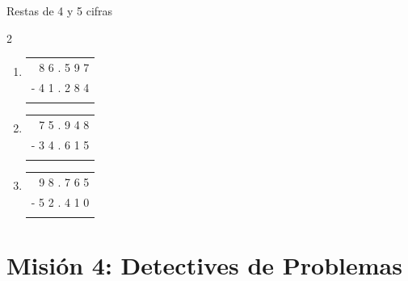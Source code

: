 \documentclass[12pt, letterpaper]{article}
\newcommand{\boxfill}[1][1.2cm]{\tcbox[on line, size=minimal, colframe=valdark!80, colback=white, boxrule=0.5pt, arc=1mm, boxsep=2pt, left=2pt, right=2pt, top=2pt, bottom=2pt]{\makebox[#1]{\vphantom{M}}}}
\begin{document}
\begin{practica}{Restas de 4 y 5 cifras }
\begin{multicols}{2}
\begin{enumerate}[itemsep=1cm]
				\item 
				\begin{tabular}{r}
					8 6 . 5 9 7 \\
					- 4 1 . 2 8 4 \\
					\hline
					\boxfill[2.2cm]
				\end{tabular}
				
				\item 
				\begin{tabular}{r}
					7 5 . 9 4 8 \\
					- 3 4 . 6 1 5 \\
					\hline
					\boxfill[2.2cm]
				\end{tabular}
				
				\item 
				\begin{tabular}{r}
					9 8 . 7 6 5 \\
					- 5 2 . 4 1 0 \\
					\hline
					\boxfill[2.2cm]
				\end{tabular}
			\end{enumerate}
		\end{multicols}
		\vspace{0.2cm}
	\end{practica}
	
	
	
	\section*{Misión 4: Detectives de Problemas}
	
\end{document}
